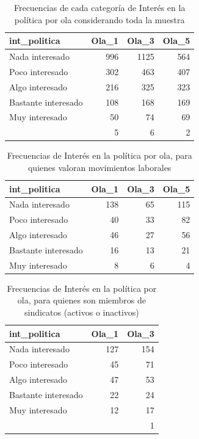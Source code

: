 \documentclass[
  12pt,
]{book}
\begin{document}
\begin{table}

\caption{\label{tab:unnamed-chunk-27}Frecuencias de cada categoría de Interés en la política por ola considerando toda la muestra}
\centering
\begin{tabular}[t]{l|r|r|r}
\hline
int\_politica & Ola\_1 & Ola\_3 & Ola\_5\\
\hline
Nada interesado & 996 & 1125 & 564\\
\hline
Poco interesado & 302 & 463 & 407\\
\hline
Algo interesado & 216 & 325 & 323\\
\hline
Bastante interesado & 108 & 168 & 169\\
\hline
Muy interesado & 50 & 74 & 69\\
\hline
 & 5 & 6 & 2\\
\hline
\end{tabular}
\end{table}

\begin{table}

\caption{\label{tab:unnamed-chunk-28}Frecuencias de Interés en la política por ola, para quienes valoran movimientos laborales}
\centering
\begin{tabular}[t]{l|r|r|r}
\hline
int\_politica & Ola\_1 & Ola\_3 & Ola\_5\\
\hline
Nada interesado & 138 & 65 & 115\\
\hline
Poco interesado & 40 & 33 & 82\\
\hline
Algo interesado & 46 & 27 & 56\\
\hline
Bastante interesado & 16 & 13 & 21\\
\hline
Muy interesado & 8 & 6 & 4\\
\hline
\end{tabular}
\end{table}

\begin{table}

\caption{\label{tab:unnamed-chunk-29}Frecuencias de Interés en la política por ola, para quienes son miembros de sindicatos (activos o inactivos)}
\centering
\begin{tabular}[t]{l|r|r}
\hline
int\_politica & Ola\_1 & Ola\_3\\
\hline
Nada interesado & 127 & 154\\
\hline
Poco interesado & 45 & 71\\
\hline
Algo interesado & 47 & 53\\
\hline
Bastante interesado & 22 & 24\\
\hline
Muy interesado & 12 & 17\\
\hline
 &  & 1\\
\hline
\end{tabular}
\end{table}
\end{document}
